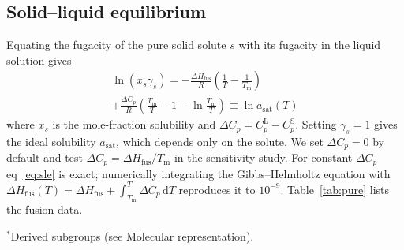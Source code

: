 \documentclass[journal=jceaax,manuscript=article,layout=twocolumn]{achemso}
\begin{document}
\subsection{Solid--liquid equilibrium}
Equating the fugacity of the pure solid solute $s$ with its fugacity in the liquid solution gives\cite{prausnitz1999}
\begin{multline}
\ln(x_s\gamma_s) = -\frac{\Delta H_\mathrm{fus}}{R}\left(\frac{1}{T}-\frac{1}{T_\mathrm{m}}\right)\\
+\frac{\Delta C_p}{R}\left(\frac{T_\mathrm{m}}{T}-1-\ln\frac{T_\mathrm{m}}{T}\right)\equiv \ln a_\mathrm{sat}(T)
\label{eq:sle}
\end{multline}
where $x_s$ is the mole-fraction solubility and $\Delta C_p=C_p^\mathrm{L}-C_p^\mathrm{S}$. Setting $\gamma_s=1$ gives the ideal solubility $a_\mathrm{sat}$, which depends only on the solute. We set $\Delta C_p=0$ by default and test $\Delta C_p=\Delta H_\mathrm{fus}/T_\mathrm{m}$ in the sensitivity study. For constant $\Delta C_p$ eq~\ref{eq:sle} is exact; numerically integrating the Gibbs--Helmholtz equation with $\Delta H_\mathrm{fus}(T)=\Delta H_\mathrm{fus}+\int_{T_\mathrm{m}}^{T}\Delta C_p\,\mathrm{d}T$ reproduces it to $10^{-9}$. Table~\ref{tab:pure} lists the fusion data.

\begin{table}
\caption{Pure-Component Data and UNIFAC Groups}
\label{tab:pure}
\small
{}

\footnotesize $^*$Derived subgroups (see Molecular representation).
\end{table}
\end{document}
